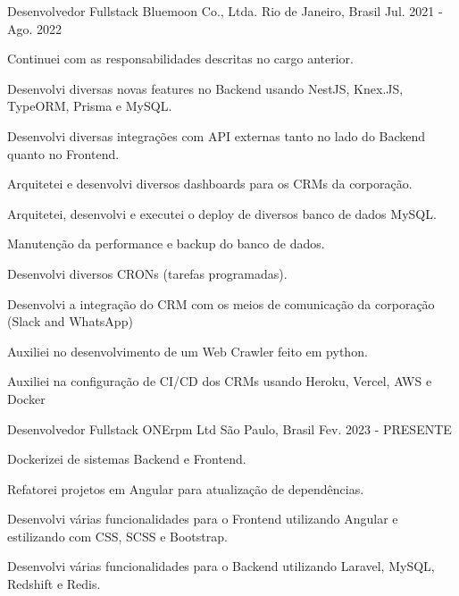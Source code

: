 \begin{cventries}
  \cventry
    {Desenvolvedor Fullstack} %
    {Bluemoon Co., Ltda.} %
    {Rio de Janeiro, Brasil} %
    {Jul. 2021 -  Ago. 2022} %
    {
      \begin{cvitems} %
        \item {Continuei com as responsabilidades descritas no cargo anterior.}
        \item {Desenvolvi diversas novas features no Backend usando NestJS, Knex.JS, TypeORM, Prisma e MySQL.}
        \item {Desenvolvi diversas integrações com API externas tanto no lado do Backend quanto no Frontend.}
        \item {Arquitetei e desenvolvi diversos dashboards para os CRMs da corporação.}
        \item {Arquitetei, desenvolvi e executei o deploy de diversos banco de dados MySQL.}
        \item {Manutenção da performance e backup do banco de dados.}
        \item {Desenvolvi diversos CRONs (tarefas programadas).}
        \item {Desenvolvi a integração do CRM com os meios de comunicação da corporação (Slack and WhatsApp)}
        \item {Auxiliei no desenvolvimento de um Web Crawler feito em python.}
        \item {Auxiliei na configuração de CI/CD dos CRMs usando Heroku, Vercel, AWS e Docker}
      \end{cvitems}
    }

      \cventry
        {Desenvolvedor Fullstack} %
        {ONErpm Ltd} %
        {São Paulo, Brasil} %
        {Fev. 2023 - PRESENTE} %
        {
          \begin{cvitems} %
            \item {Dockerizei de sistemas Backend e Frontend.}
            \item {Refatorei projetos em Angular para atualização de dependências.}
            \item {Desenvolvi várias funcionalidades para o Frontend utilizando Angular e estilizando com CSS, SCSS e Bootstrap.}
            \item {Desenvolvi várias funcionalidades para o Backend utilizando Laravel, MySQL, Redshift e Redis.}
          \end{cvitems}
        }

\end{cventries}
